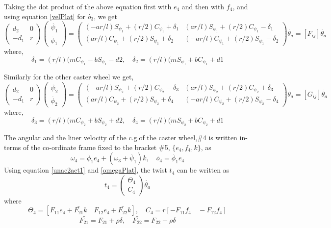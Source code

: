 Taking the dot product of the above equation first with $e_4$ and then with $f_4$, and using equation \ref{velPlat} for $\dot{o_3}$, we get
\begin{equation}
\label{unac2act1}
\begin{pmatrix}
d_2&0\\-d_1 &r
\end{pmatrix}
\begin{pmatrix}
\dot{\psi_1}\\ \dot{\phi_1}
\end{pmatrix}
=\begin{pmatrix}
(-ar/l)S_{\psi_1}+(r/2)C_{\psi_1}+\delta_1 & 
(ar/l)S_{\psi_1}+(r/2)C_{\psi_1}-\delta_1 \\
(ar/l)C_{\psi_1}+(r/2)S_{\psi_1}+\delta_2 & 
(-ar/l)C_{\psi_1}+(r/2)S_{\psi_1}-\delta_2 
\end{pmatrix}\dot{\theta_a}=[F_{ij}]\dot{\theta_a}
\end{equation}
where, 
\[ \delta_1=(r/l)(mC_{\psi_1}-bS_{\psi_1}-d2, \quad  \delta_2=(r/l)(mS_{\psi_1}+bC_{\psi_1}+d1 \]

Similarly for the other caster wheel we get,
\begin{equation}
\label{unac2act2}
\begin{pmatrix}
d_2&0\\-d_1 &r
\end{pmatrix}
\begin{pmatrix}
\dot{\psi_2}\\ \dot{\phi_2}
\end{pmatrix}
=\begin{pmatrix}
(-ar/l)S_{\psi_2}+(r/2)C_{\psi_2}-\delta_3 & 
(ar/l)S_{\psi_2}+(r/2)C_{\psi_2}+\delta_3 \\
(ar/l)C_{\psi_2}+(r/2)S_{\psi_2}+\delta_4 & 
(-ar/l)C_{\psi_2}+(r/2)S_{\psi_2}-\delta_4 
\end{pmatrix}\dot{\theta_a}=[G_{ij}]\dot{\theta_a}
\end{equation}
where, 
\[ \delta_3=(r/l)(mC_{\psi_2}+bS_{\psi_2}+d2, \quad  \delta_4=(r/l)(mS_{\psi_2}+bC_{\psi_2}+d1 \]




 The angular and the liner velocity of the c.g.of the caster wheel,\#4 is  written in-terms of the co-ordinate frame fixed to the bracket \#5, $\{e_4,f_4,k\}$, as
\begin{equation}
\label{omegacastor1}
\omega_4=\dot{\phi_1}e_4+(\omega_3+\dot{\psi_1})k, \quad
\dot{o_4}=\dot{\phi_1}e_4
\end{equation}
Using equation \ref{unac2act1} and \ref{omegaPlat}, the twist $t_4$ can be written as
\begin{equation}
\label{twist4}
t_4=\begin{pmatrix}
\Theta_4\\C_4
\end{pmatrix}\dot{\theta_a}
\end{equation}
where
\[ \Theta_4=[F_{11}e_4+\bar{F_{21}}k \quad F_{12}e_4+\bar{F_{22}}k],\quad 
C_4=r[-F_{11}f_4 \quad -F_{12}f_4]\]
\[\bar{F_{21}}=F_{21}+\rho \delta, \quad \bar{F_{22}}=F_{22}-\rho\delta\]

